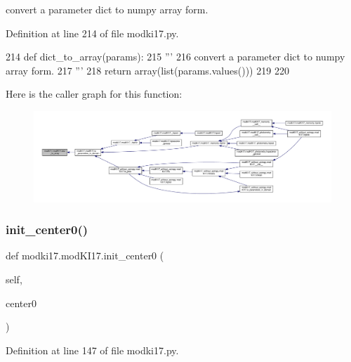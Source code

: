 \begin{DoxyVerb}convert a parameter dict to numpy array form.
\end{DoxyVerb}
 

Definition at line 214 of file modki17.\+py.


\begin{DoxyCode}
214     \textcolor{keyword}{def }dict\_to\_array(params):
215         \textcolor{stringliteral}{'''}
216 \textcolor{stringliteral}{        convert a parameter dict to numpy array form.}
217 \textcolor{stringliteral}{        '''}
218         \textcolor{keywordflow}{return} array(list(params.values()))
219     
220     
\end{DoxyCode}
Here is the caller graph for this function\+:\nopagebreak
\begin{figure}[H]
\begin{center}
\leavevmode
\includegraphics[width=350pt]{df/da3/classmodki17_1_1modKI17_a8f55186927e70d2132cc05d2cde7f25f_icgraph}
\end{center}
\end{figure}
\mbox{\label{classmodki17_1_1modKI17_a9af006489d5ced9cce3501133db4e84c}} 
\subsubsection{\texorpdfstring{init\+\_\+center0()}{init\_center0()}}
{\footnotesize\ttfamily def modki17.\+mod\+K\+I17.\+init\+\_\+center0 (\begin{DoxyParamCaption}\item[{}]{self,  }\item[{}]{center0 }\end{DoxyParamCaption})}



Definition at line 147 of file modki17.\+py.


